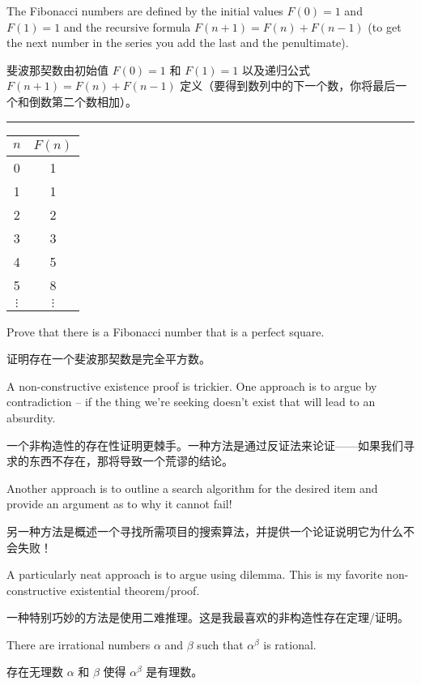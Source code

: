 \begin{exer}
      The Fibonacci numbers are defined by the initial values $F(0)=1$
      and $F(1)=1$ and the recursive formula $F(n+1) = F(n)+F(n-1)$ (to
      get the next number in the series you add the last and the penultimate).

      斐波那契数由初始值 $F(0)=1$ 和 $F(1)=1$ 以及递归公式 $F(n+1) = F(n)+F(n-1)$ 定义（要得到数列中的下一个数，你将最后一个和倒数第二个数相加）。
      \rule{72pt}{0pt} \begin{tabular}{c|c}
            $n$      & $F(n)$   \\ \hline
            0        & 1        \\
            1        & 1        \\
            2        & 2        \\
            3        & 3        \\
            4        & 5        \\
            5        & 8        \\
            $\vdots$ & $\vdots$ \\
      \end{tabular}
      \medskip

      Prove that there is a Fibonacci number that is a perfect square.

      证明存在一个斐波那契数是完全平方数。
\end{exer}

A non-constructive existence proof is trickier.  One approach is to argue
by contradiction -- if the thing we're seeking doesn't exist that will
lead to an absurdity.

一个非构造性的存在性证明更棘手。一种方法是通过反证法来论证——如果我们寻求的东西不存在，那将导致一个荒谬的结论。

Another approach is to outline a search algorithm
for the desired item and provide an argument as to why it cannot fail!

另一种方法是概述一个寻找所需项目的搜索算法，并提供一个论证说明它为什么不会失败！

A particularly neat approach is to argue using dilemma.
This is my favorite non-constructive existential theorem/proof.

一种特别巧妙的方法是使用二难推理。这是我最喜欢的非构造性存在定理/证明。
\begin{thm}
      There are irrational numbers $\alpha$ and $\beta$ such that $\alpha^\beta$
      is rational.

      存在无理数 $\alpha$ 和 $\beta$ 使得 $\alpha^\beta$ 是有理数。
\end{thm}

